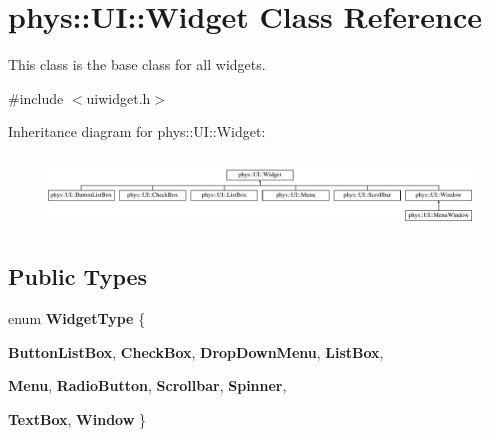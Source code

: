 \hypertarget{classphys_1_1UI_1_1Widget}{
\section{phys::UI::Widget Class Reference}
\label{d9/d48/classphys_1_1UI_1_1Widget}
}


This class is the base class for all widgets.  




{\ttfamily \#include $<$uiwidget.h$>$}

Inheritance diagram for phys::UI::Widget:\begin{figure}[H]
\begin{center}
\leavevmode
\includegraphics[height=1.91781cm]{d9/d48/classphys_1_1UI_1_1Widget}
\end{center}
\end{figure}
\subsection*{Public Types}
\begin{DoxyCompactItemize}
\item 
enum {\bfseries WidgetType} \{ \par
{\bfseries ButtonListBox}, 
{\bfseries CheckBox}, 
{\bfseries DropDownMenu}, 
{\bfseries ListBox}, 
\par
{\bfseries Menu}, 
{\bfseries RadioButton}, 
{\bfseries Scrollbar}, 
{\bfseries Spinner}, 
\par
{\bfseries TextBox}, 
{\bfseries Window}
 \}
\end{DoxyCompactItemize}
